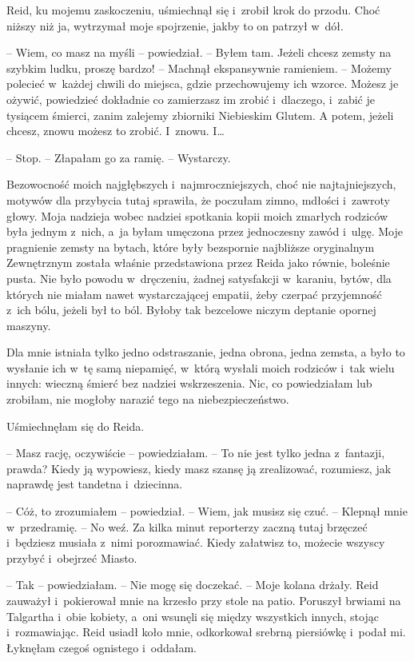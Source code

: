 \documentclass[oneside,polish,11pt,sfheadings]{mwbk}
\begin{document}
Reid, ku mojemu zaskoczeniu, uśmiechnął się i~zrobił krok do przodu.
Choć niższy niż ja, wytrzymał moje spojrzenie, jakby to on patrzył w~dół.

-- Wiem, co masz na myśli -- powiedział. -- Byłem tam. Jeżeli chcesz zemsty
na szybkim ludku, proszę bardzo! -- Machnął ekspansywnie ramieniem. -- Możemy polecieć w~każdej chwili do miejsca, gdzie przechowujemy ich
wzorce. Możesz je ożywić, powiedzieć dokładnie co zamierzasz im zrobić i~dlaczego, i~zabić je tysiącem śmierci, zanim zalejemy zbiorniki
Niebieskim Glutem. A potem, jeżeli chcesz, znowu możesz to zrobić. I~znowu. I\ldots 

-- Stop. -- Złapałam go za ramię. -- Wystarczy.

Bezowocność moich najgłębszych i~najmroczniejszych, choć nie
najtajniejszych, motywów dla przybycia tutaj sprawiła, że poczułam
zimno, mdłości i~zawroty głowy. Moja nadzieja wobec nadziei spotkania
kopii moich zmarłych rodziców była jednym z~nich, a~ja byłam umęczona
przez jednoczesny zawód i~ulgę. Moje pragnienie zemsty na bytach, które
były bezspornie najbliższe oryginalnym Zewnętrznym została właśnie
przedstawiona przez Reida jako równie, boleśnie pusta. Nie było powodu w~dręczeniu, żadnej satysfakcji w~karaniu, bytów, dla których nie miałam
nawet wystarczającej empatii, żeby czerpać przyjemność z~ich bólu,
jeżeli był to ból. Byłoby tak bezcelowe niczym deptanie opornej maszyny.

Dla mnie istniała tylko jedno odstraszanie, jedna obrona, jedna zemsta,
a było to wysłanie ich w~tę samą niepamięć, w~którą wysłali moich
rodziców i~tak wielu innych: wieczną śmierć bez nadziei wskrzeszenia.
Nic, co powiedziałam lub zrobiłam, nie mogłoby narazić tego na
niebezpieczeństwo.

Uśmiechnęłam się do Reida. 

-- Masz rację, oczywiście -- powiedziałam. -- To
nie jest tylko jedna z~fantazji, prawda? Kiedy ją wypowiesz, kiedy masz
szansę ją zrealizować, rozumiesz, jak naprawdę jest tandetna i~dziecinna.

-- Cóż, to zrozumiałem -- powiedział. -- Wiem, jak musisz się czuć. -- Klepnął mnie w~przedramię. -- No weź. Za kilka minut reporterzy zaczną
tutaj brzęczeć i~będziesz musiała z~nimi porozmawiać. Kiedy załatwisz
to, możecie wszyscy przybyć i~obejrzeć Miasto.

-- Tak -- powiedziałam. -- Nie mogę się doczekać. -- Moje kolana drżały.
Reid zauważył i~pokierował mnie na krzesło przy stole na patio. Poruszył
brwiami na Talgartha i~obie kobiety, a~oni wsunęli się między wszystkich
innych, stojąc i~rozmawiając. Reid usiadł koło mnie, odkorkował srebrną
piersiówkę i~podał mi. Łyknęłam czegoś ognistego i~oddałam.
\end{document}

